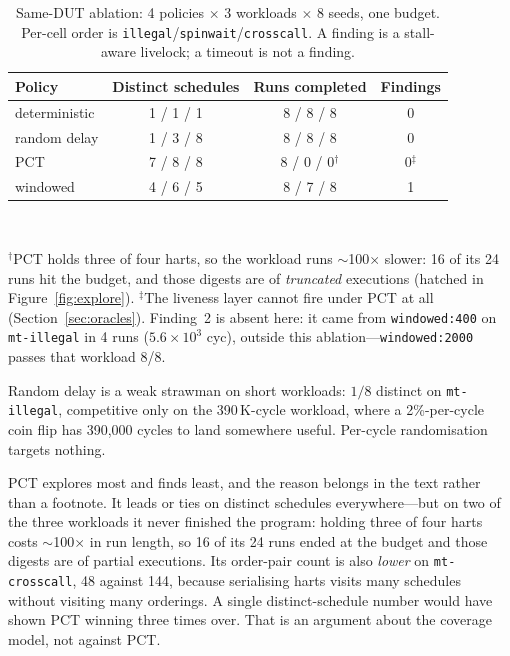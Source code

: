 \documentclass[sigconf,anonymous,review]{acmart}
\begin{document}
\begin{table}[ht]
\caption{Same-DUT ablation: 4 policies $\times$ 3 workloads $\times$ 8
seeds, one budget. Per-cell order is
\texttt{illegal}/\texttt{spinwait}/\texttt{crosscall}. A finding is a
stall-aware livelock; a timeout is not a finding.}
\label{tab:results}
\centering
\small
\begin{tabular}{@{}lccc@{}}
\toprule
Policy & Distinct schedules & Runs completed & Findings \\
\midrule
deterministic     & 1 / 1 / 1 & 8 / 8 / 8 & 0 \\
random delay      & 1 / 3 / 8 & 8 / 8 / 8 & 0 \\
PCT               & 7 / 8 / 8 & 8 / 0 / 0$^\dagger$ & 0$^\ddagger$ \\
windowed          & 4 / 6 / 5 & 8 / 7 / 8 & 1 \\
\bottomrule
\end{tabular}\\[2pt]
\begin{minipage}{\columnwidth}\scriptsize
$^\dagger$PCT holds three of four harts, so the workload runs
$\sim$100$\times$ slower: 16 of its 24 runs hit the budget, and those
digests are of \emph{truncated} executions (hatched in
Figure~\ref{fig:explore}). $^\ddagger$The liveness layer cannot fire
under PCT at all (Section~\ref{sec:oracles}). Finding~2 is absent here:
it came from \texttt{windowed:400} on \texttt{mt-illegal} in 4 runs
($5.6{\times}10^3$ cyc), outside this ablation---\texttt{windowed:2000}
passes that workload 8/8.
\end{minipage}
\end{table}

Random delay is a weak strawman on short workloads: $1/8$ distinct on
\texttt{mt-illegal}, competitive only on the 390\,K-cycle workload,
where a 2\%-per-cycle coin flip has 390{,}000 cycles to land somewhere
useful. Per-cycle randomisation targets nothing.

PCT explores most and finds least, and the reason belongs in the text
rather than a footnote. It leads or ties on distinct schedules
everywhere---but on two of the three workloads it never finished the
program: holding three of four harts costs $\sim$100$\times$ in run
length, so 16 of its 24 runs ended at the budget and those digests are
of partial executions. Its order-pair count is also \emph{lower} on
\texttt{mt-crosscall}, 48 against 144, because serialising harts visits
many schedules without visiting many orderings. A single
distinct-schedule number would have shown PCT winning three times over.
That is an argument about the coverage model, not against PCT.
\end{document}
